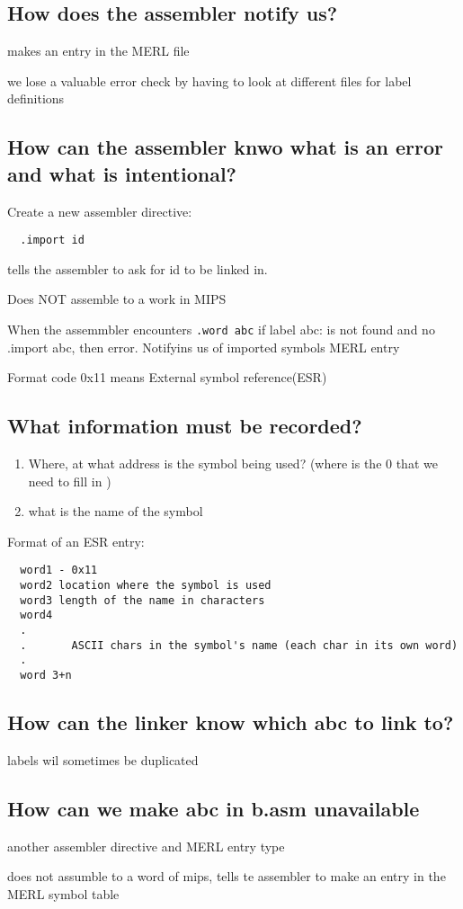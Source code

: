 \documentclass[11pt]{amsart}
\begin{document}
\subsection{How does the assembler notify us?}
\par makes an entry in the MERL file
\par we lose a valuable error check by having to look at different files for
label definitions
\subsection{How can the assembler knwo what is an error and what is
  intentional?}
\par Create a new assembler directive:
\begin{verbatim}
  .import id
\end{verbatim}
\par tells the assembler to ask for id to be linked in.
\par Does NOT assemble to a work in MIPS
\par When the assemmbler encounters \verb|.word abc| if label abc: is not found
and no .import abc, then error. Notifyins us of imported symbols MERL entry
\par Format code 0x11 means External symbol reference(ESR)
\subsection{What information must be recorded?}
\begin{enumerate}
  \item Where, at what address is the symbol being used? (where is the 0 that
    we need to fill in )
  \item what is the name of the symbol
\end{enumerate}
\par Format of an ESR entry:
\begin{verbatim}
  word1 - 0x11
  word2 location where the symbol is used
  word3 length of the name in characters
  word4
  .
  .       ASCII chars in the symbol's name (each char in its own word)
  .
  word 3+n
\end{verbatim}
\subsection{How can the linker know which abc to link to?}
\par labels wil sometimes be duplicated
\subsection{How can we make abc in b.asm unavailable}
\par another assembler directive and MERL entry type
\par does not assumble to a word of mips, tells te assembler to make an entry
in the MERL symbol table
\end{document}
